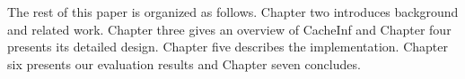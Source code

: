 The rest of this paper is organized as follows.
Chapter two introduces background and related work.
Chapter three gives an overview of CacheInf and Chapter four presents its detailed design.
Chapter five describes the implementation.
Chapter six presents our evaluation results and Chapter seven concludes.






